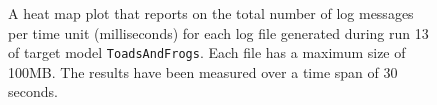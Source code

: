 \begin{figure}[htbp]
\centering
\begin{minipage}{1\textwidth}
  \centering
\end{minipage}
\caption{A heat map plot that reports on the total number of log messages per time unit (milliseconds) for each log file generated during run 13 of target model \texttt{ToadsAndFrogs}. Each file has a maximum size of 100MB. The results have been measured over a time span of 30 seconds.}
\label{figure:throughput_sum_toadsandfrogs_13}
\end{figure}